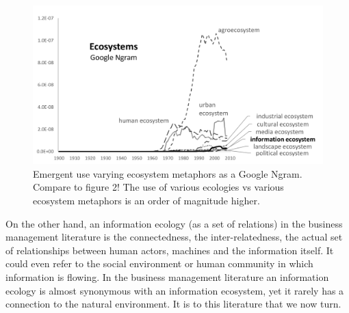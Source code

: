 \begin{figure}[!ht]
  \centering
    \includegraphics[width=5.5in]{figures/ecosystemsAll}
  \caption{Emergent use varying ecosystem metaphors as a Google Ngram. Compare to figure 2! The use of various ecologies vs various ecosystem metaphors is an order of magnitude higher.}
\end{figure}

On the other hand, an information ecology (as a set of relations) in the business management literature is the connectedness, the inter-relatedness, the actual set of relationships between human actors, machines and the information itself. It could even refer to the social environment or human community in which information is flowing. In the business management literature an information ecology is almost synonymous with an information ecosystem, yet it rarely has a connection to the natural environment. It is to this literature that we now turn.